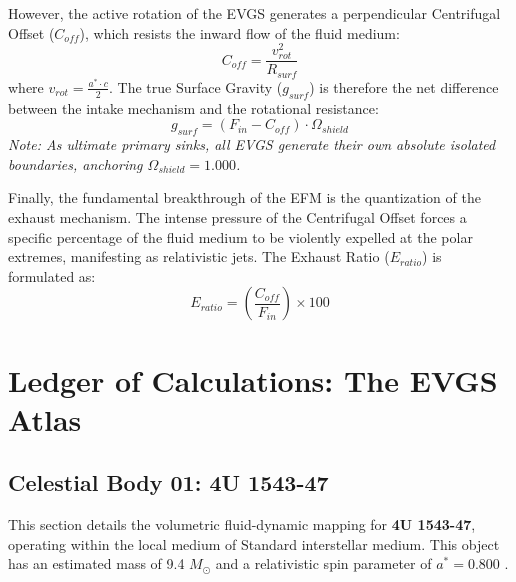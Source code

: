 \documentclass[11pt, a4paper]{article}
\begin{document}
However, the active rotation of the EVGS generates a perpendicular Centrifugal Offset ($C_{off}$), which resists the inward flow of the fluid medium:
\begin{equation}
  C_{off} = \frac{v_{rot}^2}{R_{surf}}
\end{equation}
where $v_{rot} = \frac{a^* \cdot c}{2}$. The true Surface Gravity ($g_{surf}$) is therefore the net difference between the intake mechanism and the rotational resistance:
\begin{equation}
  g_{surf} = \left( F_{in} - C_{off} \right) \cdot \Omega_{shield}
\end{equation}
\textit{Note: As ultimate primary sinks, all EVGS generate their own absolute isolated boundaries, anchoring $\Omega_{shield} = 1.000$.}

Finally, the fundamental breakthrough of the EFM is the quantization of the exhaust mechanism. The intense pressure of the Centrifugal Offset forces a specific percentage of the fluid medium to be violently expelled at the polar extremes, manifesting as relativistic jets. The Exhaust Ratio ($E_{ratio}$) is formulated as:
\begin{equation}
  E_{ratio} = \left(\frac{C_{off}}{F_{in}}\right) \times 100
\end{equation}

\clearpage
\section{Ledger of Calculations: The EVGS Atlas}

\subsection{Celestial Body 01: 4U 1543-47}
This section details the volumetric fluid-dynamic mapping for \textbf{4U 1543-47}, operating within the local medium of Standard interstellar medium. This object has an estimated mass of 9.4 $M_{\odot}$ and a relativistic spin parameter of $a^* = 0.800$ \cite{orosz2002, simbad}.
\end{document}

